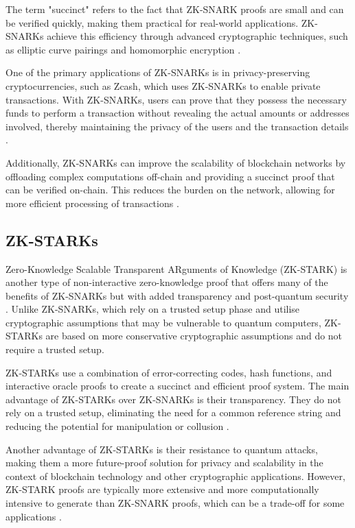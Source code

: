 The term "succinct" refers to the fact that ZK-SNARK proofs are small and can be verified quickly, making them practical for real-world applications. ZK-SNARKs achieve this efficiency through advanced cryptographic techniques, such as elliptic curve pairings and homomorphic encryption \cite{groth2016size}.

One of the primary applications of ZK-SNARKs is in privacy-preserving cryptocurrencies, such as Zcash, which uses ZK-SNARKs to enable private transactions. With ZK-SNARKs, users can prove that they possess the necessary funds to perform a transaction without revealing the actual amounts or addresses involved, thereby maintaining the privacy of the users and the transaction details \cite{hopwood2020zcash}.

Additionally, ZK-SNARKs can improve the scalability of blockchain networks by offloading complex computations off-chain and providing a succinct proof that can be verified on-chain. This reduces the burden on the network, allowing for more efficient processing of transactions \cite{bensasson2019scalable}.

\subsection{ZK-STARKs}
Zero-Knowledge Scalable Transparent ARguments of Knowledge (ZK-STARK) is another type of non-interactive zero-knowledge proof that offers many of the benefits of ZK-SNARKs but with added transparency and post-quantum security \cite{bensasson2019aurora}. Unlike ZK-SNARKs, which rely on a trusted setup phase and utilise cryptographic assumptions that may be vulnerable to quantum computers, ZK-STARKs are based on more conservative cryptographic assumptions and do not require a trusted setup.

ZK-STARKs use a combination of error-correcting codes, hash functions, and interactive oracle proofs to create a succinct and efficient proof system. The main advantage of ZK-STARKs over ZK-SNARKs is their transparency. They do not rely on a trusted setup, eliminating the need for a common reference string and reducing the potential for manipulation or collusion \cite{bensasson2018scalable}.

Another advantage of ZK-STARKs is their resistance to quantum attacks, making them a more future-proof solution for privacy and scalability in the context of blockchain technology and other cryptographic applications. However, ZK-STARK proofs are typically more extensive and more computationally intensive to generate than ZK-SNARK proofs, which can be a trade-off for some applications \cite{bensasson2020primer}.

